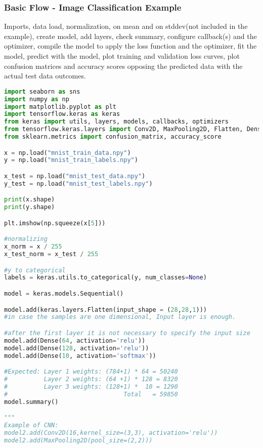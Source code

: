 \subsubsection{Basic Flow - Image Classification Example}

Imports, data load, normalization, on mean and on stddev(not included in the example), create model, add layers, check summary, configure callback(s) and the optimizer, compile the model to apply the loss function and the optimizer, fit the model, predict with the model, plot training and validation loss curves, plot confusion matrices and accuracy scores opposing the predicted data with the actual test data outcomes.

\begin{lstlisting}[language = python]
import seaborn as sns
import numpy as np
import matplotlib.pyplot as plt
import tensorflow.keras as keras 
from keras import utils, layers, models, callbacks, optimizers
from tensorflow.keras.layers import Conv2D, MaxPooling2D, Flatten, Dense
from sklearn.metrics import confusion_matrix, accuracy_score

x = np.load("mnist_train_data.npy")
y = np.load("mnist_train_labels.npy")

x_test = np.load("mnist_test_data.npy")
y_test = np.load("mnist_test_labels.npy")

print(x.shape)
print(y.shape)

plt.imshow(np.squeeze(x[5]))

#normalizing
x_norm = x / 255
x_test_norm = x_test / 255

#y to categorical
labels = keras.utils.to_categorical(y, num_classes=None)

model = keras.models.Sequential()

model.add(keras.layers.Flatten(input_shape = (28,28,1)))
#in case the samples are one dimensional, Input layer is enough.

#after the first layer it is not necessary to specify the input size
model.add(Dense(64, activation='relu'))
model.add(Dense(128, activation='relu'))
model.add(Dense(10, activation='softmax'))

#Expected: Layer 1 weights: (784+1) * 64 = 50240
#          Layer 2 weights: (64 +1) * 128 = 8320
#          Layer 3 weights: (128+1) *  10 = 1290
#                                Total   = 59850
model.summary()

"""
Example of CNN:
model2.add(Conv2D(16,kernel_size=(3,3), activation='relu'))
model2.add(MaxPooling2D(pool_size=(2,2)))


\end{lstlisting}
